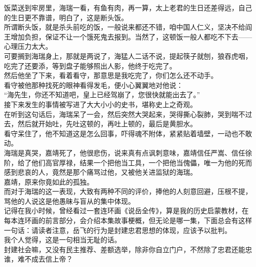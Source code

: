 \begin{multicols}{\theparacolNo}
饭菜送到牢房里，海瑞一看，有鱼有肉，再一算，太上老君的生日还差得远，自己的生日更不靠谱，明白了，这是断头饭。\\

所谓断头饭，就是杀头前吃的饭，一般说来都还不错，咱中国人仁义，坚决不给阎王增加负担，保证不让一个饿死鬼去报到。当然了，这顿饭一般人都吃不下去——心理压力太大。\\

可要搁到海瑞身上，那就是两说了，海猛人二话不说，提起筷子就刨，狼吞虎咽，吃完了还要添，等到盘子能够照出人影，他终于吃完了。\\

然后他坐了下来，看着看守，那意思是我吃完了，你们怎么还不动手。\\

看守被他那种找死的眼神看得发毛，便小心翼翼地对他说：\\

“海先生，你还不知道吧，皇上已经驾崩了，您很快就能出去了。”\\

接下来发生的事情被写进了大大小小的史书，堪称史上之奇观。\\

在听到这句话后，海瑞呆了一会，然后突然大哭起来，哭得撕心裂肺，哭到喘不过去，然后就开始吐，先吐这顿的，再吐上顿的，最后是黄胆水。\\

看守呆住了，他不知道这是怎么回事，吓得魂不附体，紧紧贴着墙壁，一动也不敢动。\\

海瑞是真哭，嘉靖死了，他很悲伤，说来真有点讽刺意味，嘉靖信任严嵩、信任徐阶，给了他们高官厚禄，结果一个把他当工具，一个把他当傀儡，唯一为他的死而感到悲哀的人，竟然是那个痛骂过他，又被他关进监狱的海瑞。\\

嘉靖，原来你竟如此的孤独。\\

而对于海瑞的这一表现，大致有两种不同的评价，捧他的人刻意回避，压根不提，骂他的人说这是他愚昧与盲从的集中体现。\\

记得在我小时候，曾经看过一套连环画《说岳全传》，算是我的历史启蒙教材，在每本连环画的前言部分，会介绍本集故事梗概，但无论是哪一集，下面总会有这样一句话：请读者注意，岳飞的行为是封建忠君思想的体现，应该予以批判。\\

我个人觉得，这是一句相当无耻的话。\\

封建社会嘛，又没有民主推荐、差额选举，除非你自立门户，不然除了忠君还能忠谁，难不成去信上帝？\\


\end{multicols}
